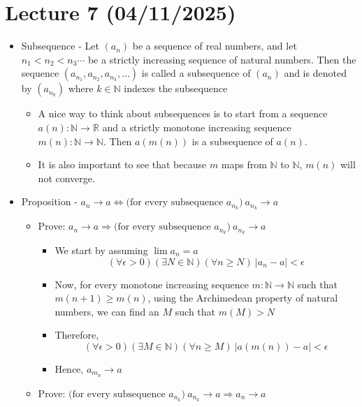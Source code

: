 \documentclass{article}
\begin{document}
\section{Lecture 7 (04/11/2025)}
\begin{itemize}
    \item Subsequence - Let $(a_n)$ be a sequence of real numbers, and let $n_1 < n_2 < n_3 \cdots$ be a strictly increasing sequence of natural numbers. Then the sequence $(a_{n_1},a_{n_2},a_{n_3}, \dots)$ is called a subsequence of $(a_n)$ and is denoted by $(a_{n_k})$ where $k \in \mathbb{N}$ indexes the subsequence
    \begin{itemize}
        \item A nice way to think about subsequences is to start from a sequence $a(n): \mathbb{N} \rightarrow \mathbb{R}$ and a strictly monotone increasing sequence $m(n): \mathbb{N} \rightarrow \mathbb{N}$. Then $a(m(n))$ is a subsequence of $a(n)$.
        \item It is also important to see that because $m$ maps from $\mathbb{N}$ to $\mathbb{N}$, $m(n)$ will not converge.
    \end{itemize}
    \item Proposition - $a_n \rightarrow a \Longleftrightarrow \text{(for every subsequence } a_{n_k}) \ a_{n_k} \rightarrow a$
    \begin{itemize}
        \item Prove: $a_n \rightarrow a \Rightarrow \text{(for every subsequence } a_{n_k}) \ a_{n_k} \rightarrow a$
        \begin{itemize}
            \item We start by assuming $\lim a_n = a$
            \[ (\forall \epsilon > 0)(\exists N \in \mathbb{N})(\forall n \ge N) \ \vert a_n - a \vert < \epsilon \]
            \item Now, for every monotone increasing sequence $m : \mathbb{N} \rightarrow \mathbb{N}$ such that $m(n+1) \ge m(n)$, using the Archimedean property of natural numbers, we can find an $M$ such that $m(M) > N$
            \item Therefore,
            \[ (\forall \epsilon > 0)(\exists M \in \mathbb{N})(\forall n \ge M) \ \vert a(m(n)) - a \vert < \epsilon \]
            \item Hence, $a_{m_n} \rightarrow a$
        \end{itemize}
        \item Prove: $\text{(for every subsequence } a_{n_k}) \ a_{n_k} \rightarrow a \Rightarrow a_n \rightarrow a$

\end{itemize}
\end{itemize}
\end{document}
